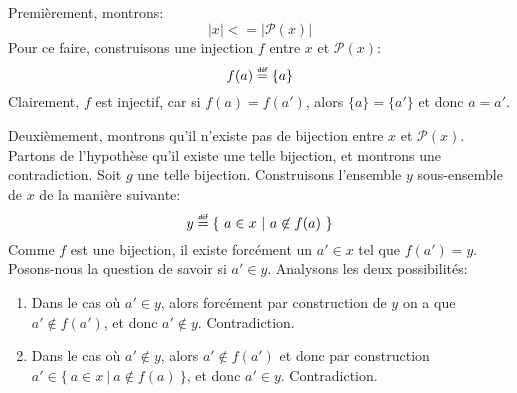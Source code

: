\documentclass[12pt,french,a4paper]{article}
\newcommand\eqdef{\mathrel{\overset{\makebox[0pt]{\mbox{\normalfont\tiny\sffamily déf}}}{=}}}
\begin{document}
\begin{question}
Premièrement, montrons:
\[
|x| <= |\mathcal{P}(x)|
\]
Pour ce faire, construisons une injection $f$ entre $x$ et $\mathcal{P}(x)$:
\[
f(a) \eqdef \{ a \}
\]
Clairement, $f$ est injectif, car si $f(a) = f(a')$, alors $\{ a \} = \{ a' \}$ et donc $a = a'$.

Deuxièmement, montrons qu'il n'existe pas de bijection entre $x$ et $\mathcal{P}(x)$.
Partons de l'hypothèse qu'il existe une telle bijection, et montrons une contradiction.
Soit $g$ une telle bijection.
Construisons l'ensemble $y$ sous-ensemble de $x$ de la manière suivante:
\[
y \eqdef \{\ a \in x\ |\ a \not\in f(a)\ \}
\]
Comme $f$ est une bijection, il existe forcément un $a' \in x$ tel que $f(a') = y$. Posons-nous la question de savoir si $a' \in y$.
Analysons les deux possibilités:
\begin{enumerate}
\item
Dans le cas où $a' \in y$, alors forcément par construction de $y$ on a que $a' \not\in f(a')$, et donc $a' \not\in y$. Contradiction.
\item
Dans le cas où $a' \not\in y$, alors $a' \not\in f(a')$ et donc par construction $a' \in \{\ a \in x\ |\ a \not\in f(a)\ \}$, et donc $a' \in y$. Contradiction.
\end{enumerate}

\end{question}

\begin{question}
\end{question}

\begin{question}
\end{question}
\end{document}
